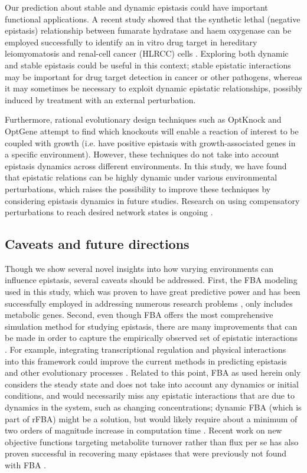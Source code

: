 \documentclass[10pt]{article}
\newcommand{\citep}{\cite}
\begin{document}
Our prediction about stable and dynamic epistasis could have important
functional applications. A recent study showed that the synthetic
lethal (negative epistasis) relationship between fumarate hydratase
and haem oxygenase can be employed successfully to identify an in
vitro drug target in hereditary leiomyomatosis and renal-cell cancer
(HLRCC) cells \citep{Frezza2011}. Exploring both dynamic and stable
epistasis could be useful in this context; stable epistatic
interactions may be
important for drug target detection in cancer or other pathogens,
whereas it may sometimes be necessary to exploit dynamic epistatic
relationships, possibly induced by treatment with an external
perturbation.

Furthermore, rational evolutionary design techniques such as OptKnock
\citep{Burgard2003} and OptGene \citep{Patil2005} attempt to find
which knockouts will enable a reaction of interest to be coupled with
growth (i.e. have positive
epistasis with growth-associated genes in a specific
environment). However, these techniques do not take into account
epistasis dynamics across different environments. In this study, we
have found that epistatic relations can be highly dynamic under
various environmental perturbations, which raises the possibility to
improve these techniques by considering epistasis dynamics in future
studies. Research on using compensatory perturbations to reach desired
network states is ongoing \citep{Cornelius2011}.

\subsection*{Caveats and future directions} Though we show several
novel insights into how varying environments can influence epistasis,
several caveats should be addressed. First, the FBA modeling used in
this study, which was proven to have great predictive power and has
been successfully employed in addressing numerous research problems
\citep{Edwards2001, Shlomi2005, Smallbone2009a}, 
only includes metabolic genes. Second, even though FBA
offers the most comprehensive simulation method for studying
epistasis, there are many improvements that can be made in order to
capture the empirically observed set of epistatic interactions
\citep{Covert2001}. For example, integrating transcriptional
regulation and physical interactions into this framework could improve
the current methods in predicting epistasis and other evolutionary
processes \citep{Szappanos2011}. Related to
this point, FBA as used herein only considers the steady state and
does not take into account any dynamics or initial conditions, and
would necessarily miss any epistatic interactions that are due to
dynamics in the system, such as changing concentrations; dynamic FBA
(which is part of rFBA) might be a solution, but would likely require
about a minimum of two orders of magnitude increase in computation
time \citep{Covert2001, Varma1994}. Recent work
on new objective functions targeting metabolite turnover rather than
flux per se has also proven successful in recovering many epistases
that were previously not found with FBA \citep{Brochado2012}.
\end{document}
